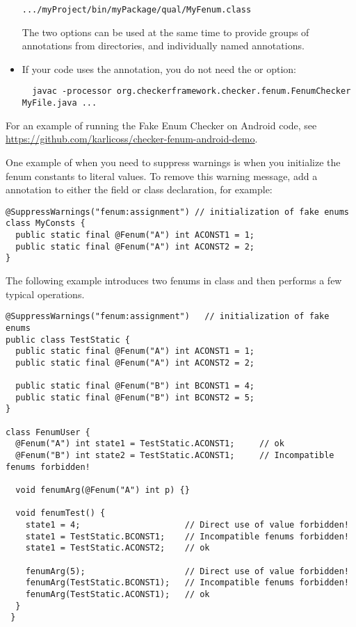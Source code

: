 \begin{itemize}
\begin{alltt}
  .../myProject/bin/myPackage/qual/MyFenum.class
\end{alltt}

The two options can be used at the same time to provide groups of annotations
from directories, and individually named annotations.

\item
If your code uses the  annotation, you do
not need the  or  option:

\begin{Verbatim}
  javac -processor org.checkerframework.checker.fenum.FenumChecker MyFile.java ...
\end{Verbatim}

\end{itemize}

For an example of running the Fake Enum Checker on Android code, see
\url{https://github.com/karlicoss/checker-fenum-android-demo}.



One example of when you need to suppress warnings is when you initialize the
fenum constants to literal values.
To remove this warning message, add a  annotation to either
the field or class declaration, for example:

\begin{Verbatim}
@SuppressWarnings("fenum:assignment") // initialization of fake enums
class MyConsts {
  public static final @Fenum("A") int ACONST1 = 1;
  public static final @Fenum("A") int ACONST2 = 2;
}
\end{Verbatim}




The following example introduces two fenums in class 
and then performs a few typical operations.

\begin{Verbatim}
@SuppressWarnings("fenum:assignment")   // initialization of fake enums
public class TestStatic {
  public static final @Fenum("A") int ACONST1 = 1;
  public static final @Fenum("A") int ACONST2 = 2;

  public static final @Fenum("B") int BCONST1 = 4;
  public static final @Fenum("B") int BCONST2 = 5;
}

class FenumUser {
  @Fenum("A") int state1 = TestStatic.ACONST1;     // ok
  @Fenum("B") int state2 = TestStatic.ACONST1;     // Incompatible fenums forbidden!

  void fenumArg(@Fenum("A") int p) {}

  void fenumTest() {
    state1 = 4;                     // Direct use of value forbidden!
    state1 = TestStatic.BCONST1;    // Incompatible fenums forbidden!
    state1 = TestStatic.ACONST2;    // ok

    fenumArg(5);                    // Direct use of value forbidden!
    fenumArg(TestStatic.BCONST1);   // Incompatible fenums forbidden!
    fenumArg(TestStatic.ACONST1);   // ok
  }
 }
\end{Verbatim}

